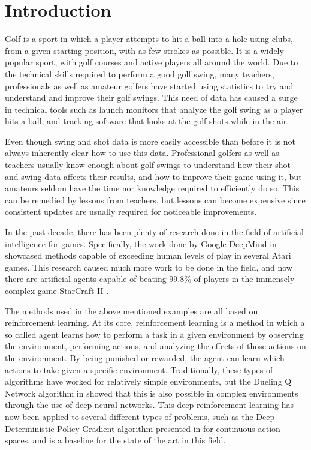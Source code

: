 \documentclass{kththesis}
\begin{document}
\mainmatter


\chapter{Introduction}
\label{chapter:introduction}
Golf is a sport in which a player attempts to hit a ball into a hole using clubs, from a given starting position, with as few strokes as possible. It is a widely popular sport, with golf courses and active players all around the world. Due to the technical skills required to perform a good golf swing, many teachers, professionals as well as amateur golfers have started using statistics to try and understand and improve their golf swings. This need of data has caused a surge in technical tools such as launch monitors that analyze the golf swing as a player hits a ball, and tracking software that looks at the golf shots while in the air. 

Even though swing and shot data is more easily accessible than before it is not always inherently clear how to use this data. Professional golfers as well as teachers usually know enough about golf swings to understand how their shot and swing data affects their results, and how to improve their game using it, but amateurs seldom have the time nor knowledge required to efficiently do so. This can be remedied by lessons from teachers, but lessons can become expensive since consistent updates are usually required for noticeable improvements. 

In the past decade, there has been plenty of research done in the field of artificial intelligence for games. Specifically, the work done by Google DeepMind in \parencite{mnih2015human} showcased methods capable of exceeding human levels of play in several Atari games. This research caused much more work to be done in the field, and now there are artificial agents capable of beating 99.8\% of players in the immensely complex game StarCraft II \parencite{vinyals2019grandmaster}. 

The methods used in the above mentioned examples are all based on reinforcement learning. At its core, reinforcement learning is a method in which a so called agent learns how to perform a task in a given environment by observing the environment, performing actions, and analyzing the effects of those actions on the environment. By being punished or rewarded, the agent can learn which actions to take given a specific environment. Traditionally, these types of algorithms have worked for relatively simple environments, but the Dueling Q Network algorithm in \parencite{mnih2015human} showed that this is also possible in complex environments through the use of deep neural networks. This deep reinforcement learning has now been applied to several different types of problems, such as the Deep Deterministic Policy Gradient algorithm presented in \parencite{lillicrap2015continuous} for continuous action spaces, and is a baseline for the state of the art in this field.
\end{document}
